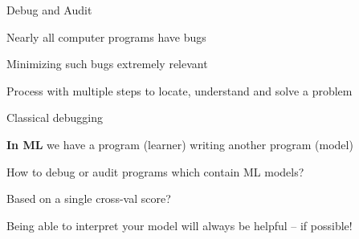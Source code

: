 \documentclass[10pt,compress,t,notes=noshow, xcolor=table]{beamer}
\begin{document}
\begin{framei}[align=top]{Debug and Audit}
\item Nearly all computer programs have bugs
\begin{itemizeS}
\item[$\leadsto$] Minimizing such bugs extremely relevant
\end{itemizeS}
\item Process with multiple steps to locate, understand and solve a problem
\begin{itemizeS}
\item[$\leadsto$] Classical debugging
\end{itemizeS}
\item \textbf{In ML} we have a program (learner) writing another program (model)
\item How to debug or audit programs which contain ML models?
\item Based on a single cross-val score?
\begin{itemizeS}
\item[$\leadsto$] Being able to interpret your model will always be helpful -- if possible!
\end{itemizeS}
\end{framei}



\end{document}
